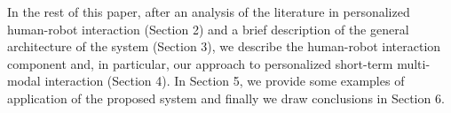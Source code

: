 In the rest of this paper, after an analysis of the literature in personalized human-robot interaction (Section 2) and a brief description of the general architecture of the {\coaches} system (Section 3), we describe the human-robot interaction component and, in particular, our approach to personalized short-term multi-modal interaction (Section 4). In Section 5, we provide some examples of application of the proposed system and finally we draw conclusions in Section 6.

